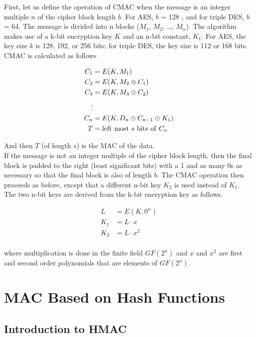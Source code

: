 \documentclass[12pt,a4paper,oneside]{report}
\begin{document}
First, let us define the operation of CMAC when the message is an integer
multiple $n$ of the cipher block length $b$. For AES, $b$ = 128 , and for triple DES,
$b$ = 64. The message is divided into n blocks ($M_1$, $M_2$, \dots, $M_n$). The algorithm
makes use of a k-bit encryption key $K$ and an n-bit constant, $K_1$. For AES, the key
size $k$ is 128, 192, or 256 bits; for triple DES, the key size is 112 or 168 bits. CMAC is
calculated as follows 

\begin{align*}
    C_1 &= E(K,M_1) \\
    C_2 &= E(K,M_2 \oplus C_1) \\
    C_3 &= E(K,M_3 \oplus C_2) \\
    \vdots \\
    C_n &= E(K,D_n \oplus C_{n-1} \oplus K_1) \\
    T   &= {\rm left\ most\ }s{\rm\ bits\ of\ }C_n
\end{align*}

And then $T$ (of length $s$) is the MAC of the data.\\

If the message is not an integer multiple of the cipher block length, then the
final block is padded to the right (least significant bits) with a 1 and as many 0s as
necessary so that the final block is also of length $b$. The CMAC operation then proceeds
as before, except that a different n-bit key $K_2$ is used instead of $K_1$.\\

The two n-bit keys are derived from the k-bit encryption key as follows.

\begin{align*}
    L &= E(K,0^n) \\
    K_1 &= L \cdot x \\
    K_2 &= L \cdot x^2 \\
\end{align*}

where multiplication is done in the finite field $GF(2^n)$ and $x$ and $x^2$ are first and
second order polynomials that are elements of $GF(2^n)$. 

\section{MAC Based on Hash Functions}

\subsection{Introduction to HMAC}
\end{document}
